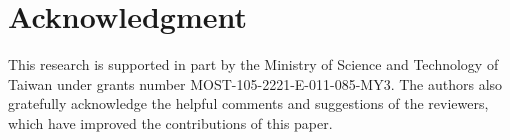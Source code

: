 \section*{Acknowledgment}

This research is supported in part by the Ministry of Science and Technology of Taiwan under grants number MOST-105-2221-E-011-085-MY3. The authors also gratefully acknowledge the helpful comments and suggestions of the reviewers, which have improved the contributions of this paper.